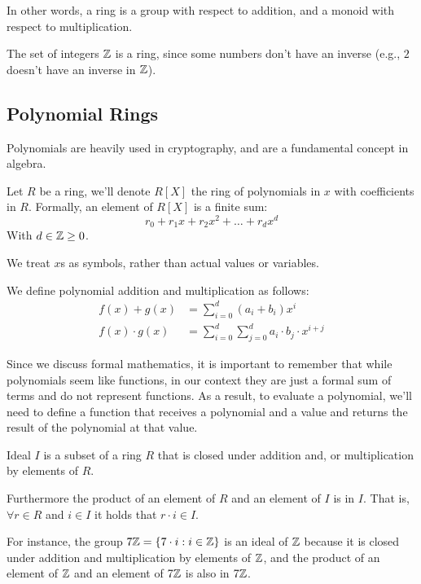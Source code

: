 In other words, a ring is a group with respect to addition, and a monoid with respect to multiplication.

\begin{example}
    The set of integers $\mathbb{Z}$ is a ring, since some numbers don't 
    have an inverse (e.g., $2$ doesn't have an inverse in $\mathbb{Z}$). 
\end{example}


\subsection{Polynomial Rings}
Polynomials are heavily used in cryptography, and are a fundamental concept in algebra.
\begin{definition}
    Let $R$ be a ring, we'll denote $R[X]$ the ring of polynomials
    in $x$ with coefficients in $R$. Formally, an element of $R[X]$ is a finite
    sum: $$ r_0 + r_1x +r_2x^2 +\dots +r_dx^d$$
    With $d\in\mathbb{Z}\ge0$.

    We treat $x$s as symbols, rather than actual values or variables.

    We define polynomial addition and multiplication as follows:
    \begin{align*}
        f(x) + g(x) &= \sum_{i=0}^{d}{(a_i+b_i)x^i} \\
        f(x) \cdot g(x) &= \sum_{i=0}^{d}{\sum_{j=0}^{d}{a_i\cdot b_j\cdot x^{i+j}}}
    \end{align*}
\end{definition} \label{def:polynomial-ring}\label{def:polynomial}

Since we discuss formal mathematics, it is important to remember that while polynomials seem like functions,
in our context they are just a formal sum of terms and do not represent functions.
As a result, to evaluate a polynomial, we'll need to define a function that receives a polynomial 
and a value and returns the result of the polynomial at that value.


\begin{definition}
    Ideal $I$ is a subset of a ring $R$ that is closed under addition and, or multiplication by elements of $R$.

    Furthermore the product of an element of $R$ and an element of $I$ is in $I$.
    That is, $\forall r\in R$ and $i\in I$ it holds that $r\cdot i\in I$.
\end{definition}

For instance, the group $7\mathbb{Z}=\{7\cdot i:i\in\mathbb{Z}\}$ is an ideal of $\mathbb{Z}$ because it is closed
under addition and multiplication by elements of $\mathbb{Z}$,
and the product of an element of $\mathbb{Z}$ and an element of $7\mathbb{Z}$ is also in $7\mathbb{Z}$.


